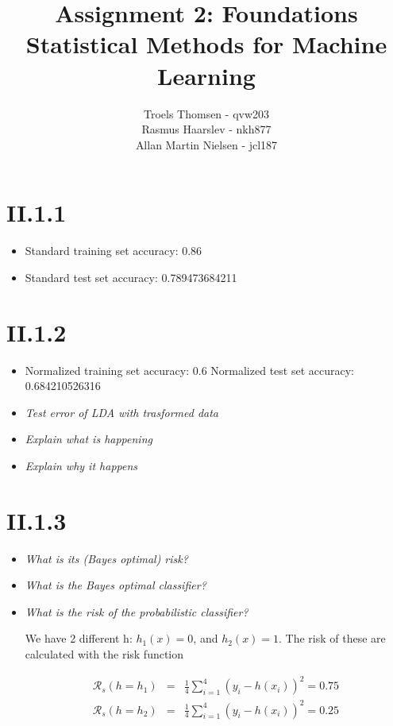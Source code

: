 \documentclass[12pt, a4paper]{article}
\title{Assignment 2: Foundations\\Statistical Methods for Machine Learning}
\author{Troels Thomsen - qvw203\\Rasmus Haarslev - nkh877\\Allan Martin Nielsen - jcl187}
\begin{document}
\pagestyle{empty}
\maketitle
{}
\newpage

\tableofcontents
\newpage

\pagestyle{fancy}

\section{II.1.1}
\begin{itemize}
	\item Standard training set accuracy: 0.86
	\item Standard test set accuracy: 0.789473684211
\end{itemize}



\section{II.1.2}
\begin{itemize}
	\item Normalized training set accuracy: 0.6
		  Normalized test set accuracy: 0.684210526316
	\item \textit{Test error of LDA with trasformed data}
	\item \textit{Explain what is happening}
	\item \textit{Explain why it happens}
\end{itemize}

\section{II.1.3}
\begin{itemize}
\item \textit{What is its (Bayes optimal) risk?}
\item \textit{What is the Bayes optimal classifier?}
\item \textit{What is the risk of the probabilistic classifier?}

We have 2 different h: $h_1(x) = 0$, and $h_2(x) = 1$. The risk of these are calculated with the risk function

\begin{eqnarray}
	\mathcal{R}_s(h = h_1) &=& \frac{1}{4} \sum^4_{i=1} (y_i - h(x_i))^2 = 0.75 \\
	\mathcal{R}_s(h = h_2) &=& \frac{1}{4} \sum^4_{i=1} (y_i - h(x_i))^2 = 0.25
\end{eqnarray}

\end{itemize}
\end{document}
